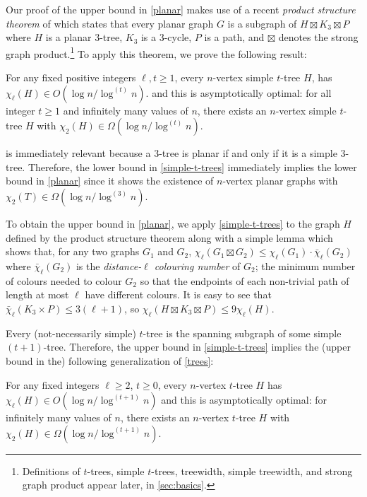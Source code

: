 \documentclass[kpfonts]{patmorin}
\newcommand{\trn}{\chi_2}
\newcommand{\lrn}{\chi_{\ell}}
\newcommand{\dlcn}{\bar{\chi}_\ell}
\theoremstyle{named}
\begin{document}
Our proof of the upper bound in \cref{planar} makes use of a recent \emph{product structure theorem} of \citet{dujmovic.joret.ea:planar} which states that every planar graph $G$ is a subgraph of $H\boxtimes K_3\boxtimes P$ where $H$ is a planar $3$-tree, $K_3$ is a 3-cycle, $P$ is a path, and $\boxtimes$ denotes the strong graph product.\footnote{Definitions of $t$-trees, simple $t$-trees, treewidth, simple treewidth, and strong graph product appear later, in \cref{sec:basics}.}  To apply this theorem, we prove the following result:

\begin{thm}\label{simple-t-trees}
    For any fixed positive integers $\ell,t\ge 1$, every $n$-vertex simple $t$-tree $H$, has $\lrn(H) \in O(\log n/\log^{(t)}n)$.
    and this is asymptotically optimal: for all integer $t\ge 1$ and infinitely many values of $n$, there exists an $n$-vertex simple $t$-tree $H$ with $\trn(H)\in\Omega(\log n/\log^{(t)} n)$.
\end{thm}

 is immediately relevant because a 3-tree is planar if and only if it is a simple $3$-tree. Therefore, the lower bound in \cref{simple-t-trees} immediately implies the lower bound in \cref{planar} since it shows the existence of $n$-vertex planar graphs with $\trn(T)\in\Omega(\log n/\log^{(3)} n)$.

To obtain the upper bound in \cref{planar}, we apply \cref{simple-t-trees} to the graph $H$ defined by the product structure theorem along with a simple lemma which shows that, for any two graphs $G_1$ and $G_2$, $\lrn(G_1\boxtimes G_2)\le \lrn(G_1)\cdot\dlcn(G_2)$ where $\dlcn(G_2)$ is the \emph{distance-$\ell$ colouring number} of $G_2$;  the minimum number of colours needed to colour $G_2$ so that the endpoints of each non-trivial path of length at most $\ell$ have different colours.  It is easy to see that $\dlcn(K_3\times P)\le 3(\ell+1)$, so $\lrn(H\boxtimes K_3\boxtimes P)\le 9\lrn(H)$.

Every (not-necessarily simple) $t$-tree is the spanning subgraph of some simple $(t+1)$-tree. Therefore, the upper bound in \cref{simple-t-trees} implies the (upper bound in the) following generalization of \cref{trees}:

\begin{thm}\label{t-trees}
    For any fixed integers $\ell\ge 2$, $t\ge 0$, every $n$-vertex $t$-tree $H$ has $\lrn(H) \in O(\log n/\log^{(t+1)} n)$ and this is asymptotically optimal: for infinitely many values of $n$, there exists an $n$-vertex $t$-tree $H$ with $\trn(H)\in\Omega(\log n/\log^{(t+1)} n)$.
\end{thm}
\end{document}
